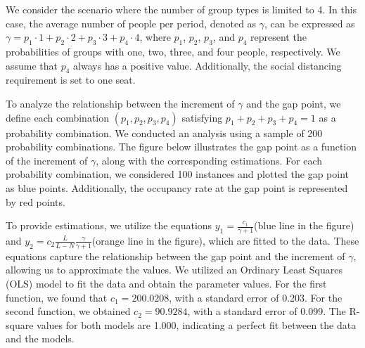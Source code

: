
We consider the scenario where the number of group types is limited to 4. In this case, the average number of people per period, denoted as $\gamma$, can be expressed as $\gamma = p_1 \cdot 1 + p_2 \cdot 2 + p_3 \cdot 3 + p_4 \cdot 4$, where $p_1$, $p_2$, $p_3$, and $p_4$ represent the probabilities of groups with one, two, three, and four people, respectively. We assume that $p_4$ always has a positive value. Additionally, the social distancing requirement is set to one seat.

To analyze the relationship between the increment of $\gamma$ and the gap point, we define each combination $(p_1, p_2, p_3, p_4)$ satisfying $p_1 + p_2 + p_3 + p_4 = 1$ as a probability combination. We conducted an analysis using a sample of 200 probability combinations. The figure below illustrates the gap point as a function of the increment of $\gamma$, along with the corresponding estimations. For each probability combination, we considered 100 instances and plotted the gap point as blue points. Additionally, the occupancy rate at the gap point is represented by red points.

To provide estimations, we utilize the equations $y_1 = \frac{c_1}{\gamma +1}$(blue line in the figure) and $y_2 = c_2 \frac{L}{L-N} \frac{\gamma}{\gamma+1}$(orange line in the figure), which are fitted to the data. These equations capture the relationship between the gap point and the increment of $\gamma$, allowing us to approximate the values. We utilized an Ordinary Least Squares (OLS) model to fit the data and obtain the parameter values. For the first function, we found that $c_1 = 200.0208$, with a standard error of 0.203. For the second function, we obtained $c_2 = 90.9284$, with a standard error of 0.099. The R-square values for both models are 1.000, indicating a perfect fit between the data and the models.


